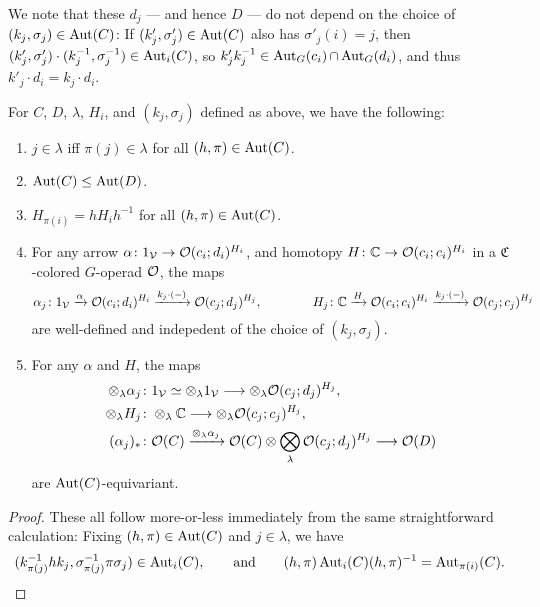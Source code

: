 \documentclass[a4paper,10pt
,draft
]{article}%
\renewcommand{\1}{\eta}%
\begin{document}
\begin{remark}
      We note that these $d_j$ --- and hence $D$ --- do not depend on the choice of $(k_j,\sigma_j) \in \operatorname{Aut}(C)$:
      If $(k'_j, \sigma'_j) \in \operatorname{Aut}(C)$ also has $\sigma'_j(i) = j$, then
      $(k'_j, \sigma'_j) \cdot (k_j^{-1}, \sigma_j^{-1}) \in \operatorname{Aut}_i(C)$,
      so $k'_j k_j^{-1} \in \operatorname{Aut}_G(c_i) \mathop{\cap} \operatorname{Aut}_G(d_i)$,
      and thus $k'_j \cdot d_i = k_j \cdot d_i$.
\end{remark}


\begin{lemma}
      \label{AUTC_LEM}
      For $C$, $D$, $\lambda$, $H_i$, and $(k_j, \sigma_j)$ defined as above, we have the following:
      \begin{enumerate}[label = (\roman*)]
      \item $j \in \lambda$ iff $\pi(j) \in \lambda$ for all $(h,\pi) \in \operatorname{Aut}(C)$.
      \item $\operatorname{Aut}(C) \leq \operatorname{Aut}(D)$.
      \item $H_{\pi(i)} = h H_i h^{-1}$ for all $(h,\pi) \in \operatorname{Aut}(C)$.
      \item For any arrow
            $\alpha \colon 1_{\mathcal V} \to \mathcal{O}(c_i;d_i)^{H_i}$,
            and homotopy
            $H \colon \mathbb C \to \mathcal{O}(c_i;c_i)^{H_i}$
            in a $\mathfrak C$-colored $G$-operad $\mathcal{O}$,
            the maps
            \begin{equation}
                  \alpha_j \colon 1_{\mathcal V} \xrightarrow{\alpha} \mathcal{O}(c_i; d_i)^{H_i} \xrightarrow{ k_j \cdot (-) } \mathcal{O}(c_j; d_j)^{H_j},
                  \qquad \qquad
                  H_j \colon \mathbb C \xrightarrow{H} \mathcal{O}(c_i;c_i)^{H_i} \xrightarrow{k_j \cdot (-)} \mathcal{O}(c_j;c_j)^{H_j}
            \end{equation}
            are well-defined and indepedent of the choice of $(k_j, \sigma_j)$.
      \item For any $\alpha$ and $H$, the maps
            \begin{align*}
              \otimes_\lambda \alpha_j \colon & 1_\V \simeq \otimes_\lambda 1_\V \longto \otimes_\lambda \O(c_j; d_j)^{H_j},
              \\
              \otimes_\lambda H_j \colon & \otimes_\lambda \mathbb C \longto \otimes_\lambda \O(c_j;c_j)^{H_j},
              \\
              (\alpha_j)_{\**} \colon & \O(C) \xrightarrow{\otimes_\lambda \alpha_j} \O(C) \otimes \bigotimes_\lambda \O(c_j; d_j)^{H_j} \longto \O(D)
            \end{align*}
            are $\operatorname{Aut}(C)$-equivariant.
      \end{enumerate}
\end{lemma}
\begin{proof}
      These all follow more-or-less immediately from the same straightforward calculation:
      Fixing $(h,\pi) \in \operatorname{Aut}(C)$ and $j \in \lambda$, we have
      \begin{equation}
            (k_{\pi(j)}^{-1} h k_j, \sigma_{\pi(j)}^{-1} \pi \sigma_j) \in \operatorname{Aut}_i(C),
            \qquad
            \textrm{and}
            \qquad
            (h,\pi) \operatorname{Aut}_i(C) (h,\pi)^{-1} = \operatorname{Aut}_{\pi(i)}(C).
      \end{equation}
\end{proof}
\end{document}
